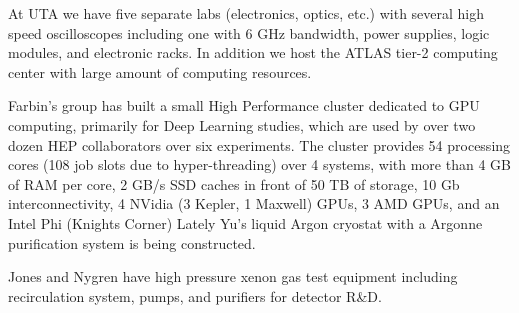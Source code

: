 
At UTA we have five separate labs (electronics, optics, etc.) with several high speed oscilloscopes including one with 6 GHz bandwidth, power supplies, logic modules, and electronic racks.
In addition we host the ATLAS tier-2 computing center with large amount of computing resources.

Farbin's group has built a small High Performance cluster dedicated to                                                                                                              
GPU computing, primarily for Deep Learning studies, which are used by
over two dozen HEP collaborators over six experiments. The cluster
provides 54 processing cores (108 job slots due to hyper-threading) 
over 4 systems, with more than 4 GB of RAM per core, 2 GB/s SSD caches
in front of 50 TB of storage, 10 Gb interconnectivity, 4 NVidia (3 
Kepler, 1 Maxwell) GPUs, 3 AMD GPUs, and an Intel Phi (Knights
Corner)
Lately Yu's liquid Argon cryostat with a Argonne purification system is being constructed.

Jones and Nygren have high pressure xenon gas test equipment including recirculation system, pumps, and purifiers for detector R\&D. 

